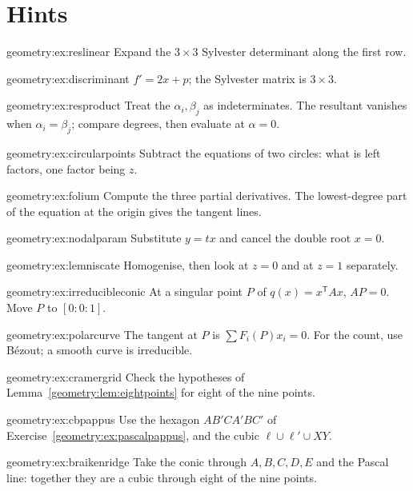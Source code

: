 \section{Hints}

\begin{hint}{geometry:ex:reslinear}
Expand the $3\times3$ Sylvester determinant along the first row.
\end{hint}
\begin{hint}{geometry:ex:discriminant}
$f'=2x+p$; the Sylvester matrix is $3\times3$.
\end{hint}
\begin{hint}{geometry:ex:resproduct}
Treat the $\alpha_i,\beta_j$ as indeterminates. The resultant vanishes when $\alpha_i=\beta_j$; compare degrees, then evaluate at $\alpha=0$.
\end{hint}
\begin{hint}{geometry:ex:circularpoints}
Subtract the equations of two circles: what is left factors, one factor being $z$.
\end{hint}
\begin{hint}{geometry:ex:folium}
Compute the three partial derivatives. The lowest-degree part of the equation at the origin gives the tangent lines.
\end{hint}
\begin{hint}{geometry:ex:nodalparam}
Substitute $y=tx$ and cancel the double root $x=0$.
\end{hint}
\begin{hint}{geometry:ex:lemniscate}
Homogenise, then look at $z=0$ and at $z=1$ separately.
\end{hint}
\begin{hint}{geometry:ex:irreducibleconic}
At a singular point $P$ of $q(x)=x^{\mathsf T}Ax$, $AP=0$. Move $P$ to $[0:0:1]$.
\end{hint}
\begin{hint}{geometry:ex:polarcurve}
The tangent at $P$ is $\sum F_i(P)x_i=0$. For the count, use B\'ezout; a smooth curve is irreducible.
\end{hint}
\begin{hint}{geometry:ex:cramergrid}
Check the hypotheses of Lemma~\ref{geometry:lem:eightpoints} for eight of the nine points.
\end{hint}
\begin{hint}{geometry:ex:cbpappus}
Use the hexagon $AB'CA'BC'$ of Exercise~\ref{geometry:ex:pascalpappus}, and the cubic $\ell\cup\ell'\cup XY$.
\end{hint}
\begin{hint}{geometry:ex:braikenridge}
Take the conic through $A,B,C,D,E$ and the Pascal line: together they are a cubic through eight of the nine points.
\end{hint}

